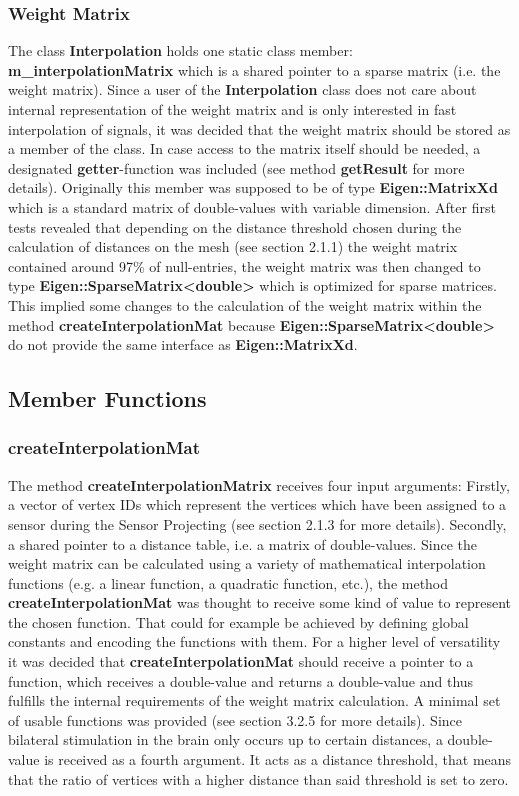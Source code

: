 \subsubsection{Weight Matrix}
The class \textbf{Interpolation} holds one static class member: \textbf{m\_interpolationMatrix} which is a shared pointer to a sparse matrix (i.e. the weight matrix). Since a user of the \textbf{Interpolation} class does not care about internal representation of the weight matrix and is only interested in fast interpolation of signals, it was decided that the weight matrix should be stored as a member of the class. In case access to the matrix itself should be needed, a designated \textbf{getter}-function was included (see method \textbf{getResult} for more details).
Originally this member was supposed to be of type \textbf{Eigen::MatrixXd} which is a standard matrix of double-values with variable dimension. After first tests revealed that depending on the distance threshold chosen during the calculation of distances on the mesh (see section 2.1.1) the weight matrix contained around 97\% of null-entries, the weight matrix was then changed to type \textbf{Eigen::SparseMatrix<double>} which is optimized for sparse matrices. This implied some changes to the calculation of the weight matrix within the method \textbf{createInterpolationMat} because \textbf{Eigen::SparseMatrix<double>} do not provide the same interface as \textbf{Eigen::MatrixXd}.

\subsection{Member Functions}

\subsubsection{createInterpolationMat}
The method \textbf{createInterpolationMatrix} receives four input arguments: Firstly, a vector of vertex IDs which represent the vertices which have been assigned to a sensor during the Sensor Projecting (see section 2.1.3 for more details). Secondly, a shared pointer to a distance table, i.e. a matrix of double-values. Since the weight matrix can be calculated using a variety of mathematical interpolation functions (e.g. a linear function, a quadratic function, etc.), the method \textbf{createInterpolationMat} was thought to receive some kind of value to represent the chosen function. That could for example be achieved by defining global constants and encoding the functions with them. For a higher level of versatility it was decided that \textbf{createInterpolationMat} should receive a pointer to a function, which receives a double-value and returns a double-value and thus fulfills the internal requirements of the weight matrix calculation. A minimal set of usable functions was provided (see section 3.2.5 for more details). Since bilateral stimulation in the brain only occurs up to certain distances, a double-value is received as a fourth argument. It acts as a distance threshold, that means that the ratio of vertices with a higher distance than said threshold is set to zero.

